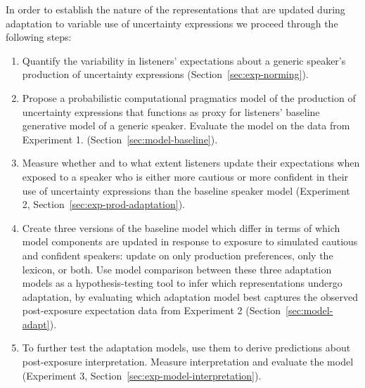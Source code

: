 \documentclass[lucida,biblatex]{sp} %
\newcommand{\sectionref}[1]{Section~\ref{#1}}
\begin{document}
In order to establish the nature of the representations that are updated during adaptation to variable use of uncertainty expressions we proceed through the following steps:
\begin{enumerate}
	\item Quantify the variability in listeners' expectations about a generic speaker's production of uncertainty expressions (\sectionref{sec:exp-norming}).
	\item Propose a probabilistic computational pragmatics model of the production of uncertainty expressions that functions as proxy for listeners' baseline generative model of a generic speaker. Evaluate the model on the data from Experiment 1. (\sectionref{sec:model-baseline}).
	\item Measure whether and to what extent listeners update their expectations when exposed to a speaker who is either more cautious or more confident in their use of uncertainty expressions than the baseline speaker model (Experiment 2, \sectionref{sec:exp-prod-adaptation}).
	\item Create three versions of the baseline model which differ  in terms of which model components are updated in response to exposure to simulated cautious and confident speakers: update on only production preferences, only the lexicon, or both. Use model comparison between these three adaptation models as a hypothesis-testing tool to infer which representations undergo adaptation, by evaluating which adaptation model best captures the observed post-exposure expectation data from Experiment 2 (\sectionref{sec:model-adapt}).
	\item To further test the adaptation models, use them to derive predictions about post-exposure interpretation. Measure interpretation and evaluate the model (Experiment 3, \sectionref{sec:exp-model-interpretation}).
\end{enumerate}


\end{document}
